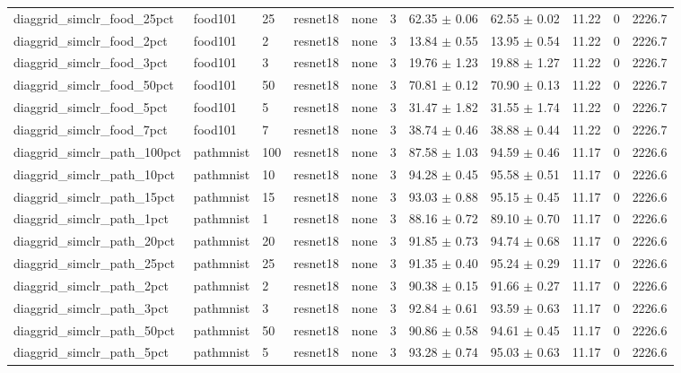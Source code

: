 \begin{tabular}{lllllllllll}
diaggrid_simclr_food_25pct & food101 & 25 & resnet18 & none & 3 & 62.35 $\pm$ 0.06 & 62.55 $\pm$ 0.02 & 11.22 & 0 & 2226.7 \\
diaggrid_simclr_food_2pct & food101 & 2 & resnet18 & none & 3 & 13.84 $\pm$ 0.55 & 13.95 $\pm$ 0.54 & 11.22 & 0 & 2226.7 \\
diaggrid_simclr_food_3pct & food101 & 3 & resnet18 & none & 3 & 19.76 $\pm$ 1.23 & 19.88 $\pm$ 1.27 & 11.22 & 0 & 2226.7 \\
diaggrid_simclr_food_50pct & food101 & 50 & resnet18 & none & 3 & 70.81 $\pm$ 0.12 & 70.90 $\pm$ 0.13 & 11.22 & 0 & 2226.7 \\
diaggrid_simclr_food_5pct & food101 & 5 & resnet18 & none & 3 & 31.47 $\pm$ 1.82 & 31.55 $\pm$ 1.74 & 11.22 & 0 & 2226.7 \\
diaggrid_simclr_food_7pct & food101 & 7 & resnet18 & none & 3 & 38.74 $\pm$ 0.46 & 38.88 $\pm$ 0.44 & 11.22 & 0 & 2226.7 \\
diaggrid_simclr_path_100pct & pathmnist & 100 & resnet18 & none & 3 & 87.58 $\pm$ 1.03 & 94.59 $\pm$ 0.46 & 11.17 & 0 & 2226.6 \\
diaggrid_simclr_path_10pct & pathmnist & 10 & resnet18 & none & 3 & 94.28 $\pm$ 0.45 & 95.58 $\pm$ 0.51 & 11.17 & 0 & 2226.6 \\
diaggrid_simclr_path_15pct & pathmnist & 15 & resnet18 & none & 3 & 93.03 $\pm$ 0.88 & 95.15 $\pm$ 0.45 & 11.17 & 0 & 2226.6 \\
diaggrid_simclr_path_1pct & pathmnist & 1 & resnet18 & none & 3 & 88.16 $\pm$ 0.72 & 89.10 $\pm$ 0.70 & 11.17 & 0 & 2226.6 \\
diaggrid_simclr_path_20pct & pathmnist & 20 & resnet18 & none & 3 & 91.85 $\pm$ 0.73 & 94.74 $\pm$ 0.68 & 11.17 & 0 & 2226.6 \\
diaggrid_simclr_path_25pct & pathmnist & 25 & resnet18 & none & 3 & 91.35 $\pm$ 0.40 & 95.24 $\pm$ 0.29 & 11.17 & 0 & 2226.6 \\
diaggrid_simclr_path_2pct & pathmnist & 2 & resnet18 & none & 3 & 90.38 $\pm$ 0.15 & 91.66 $\pm$ 0.27 & 11.17 & 0 & 2226.6 \\
diaggrid_simclr_path_3pct & pathmnist & 3 & resnet18 & none & 3 & 92.84 $\pm$ 0.61 & 93.59 $\pm$ 0.63 & 11.17 & 0 & 2226.6 \\
diaggrid_simclr_path_50pct & pathmnist & 50 & resnet18 & none & 3 & 90.86 $\pm$ 0.58 & 94.61 $\pm$ 0.45 & 11.17 & 0 & 2226.6 \\
diaggrid_simclr_path_5pct & pathmnist & 5 & resnet18 & none & 3 & 93.28 $\pm$ 0.74 & 95.03 $\pm$ 0.63 & 11.17 & 0 & 2226.6 \\

\end{tabular}

